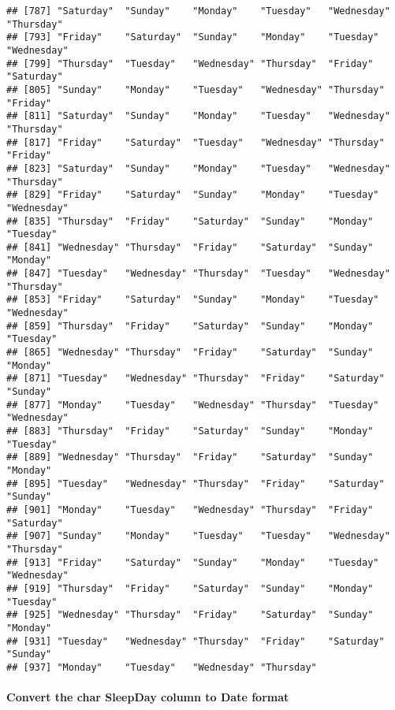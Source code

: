 \documentclass[
]{article}
\newenvironment{Shaded}{\begin{snugshade}}{\end{snugshade}}
\newcommand{\CommentTok}[1]{\textcolor[rgb]{0.56,0.35,0.01}{\textit{#1}}}
\newcommand{\FunctionTok}[1]{\textcolor[rgb]{0.00,0.00,0.00}{#1}}
\newcommand{\NormalTok}[1]{#1}
\newcommand{\OtherTok}[1]{\textcolor[rgb]{0.56,0.35,0.01}{#1}}
\newcommand{\SpecialCharTok}[1]{\textcolor[rgb]{0.00,0.00,0.00}{#1}}
\newcommand{\StringTok}[1]{\textcolor[rgb]{0.31,0.60,0.02}{#1}}
\begin{document}
\begin{verbatim}
## [787] "Saturday"  "Sunday"    "Monday"    "Tuesday"   "Wednesday" "Thursday" 
## [793] "Friday"    "Saturday"  "Sunday"    "Monday"    "Tuesday"   "Wednesday"
## [799] "Thursday"  "Tuesday"   "Wednesday" "Thursday"  "Friday"    "Saturday" 
## [805] "Sunday"    "Monday"    "Tuesday"   "Wednesday" "Thursday"  "Friday"   
## [811] "Saturday"  "Sunday"    "Monday"    "Tuesday"   "Wednesday" "Thursday" 
## [817] "Friday"    "Saturday"  "Tuesday"   "Wednesday" "Thursday"  "Friday"   
## [823] "Saturday"  "Sunday"    "Monday"    "Tuesday"   "Wednesday" "Thursday" 
## [829] "Friday"    "Saturday"  "Sunday"    "Monday"    "Tuesday"   "Wednesday"
## [835] "Thursday"  "Friday"    "Saturday"  "Sunday"    "Monday"    "Tuesday"  
## [841] "Wednesday" "Thursday"  "Friday"    "Saturday"  "Sunday"    "Monday"   
## [847] "Tuesday"   "Wednesday" "Thursday"  "Tuesday"   "Wednesday" "Thursday" 
## [853] "Friday"    "Saturday"  "Sunday"    "Monday"    "Tuesday"   "Wednesday"
## [859] "Thursday"  "Friday"    "Saturday"  "Sunday"    "Monday"    "Tuesday"  
## [865] "Wednesday" "Thursday"  "Friday"    "Saturday"  "Sunday"    "Monday"   
## [871] "Tuesday"   "Wednesday" "Thursday"  "Friday"    "Saturday"  "Sunday"   
## [877] "Monday"    "Tuesday"   "Wednesday" "Thursday"  "Tuesday"   "Wednesday"
## [883] "Thursday"  "Friday"    "Saturday"  "Sunday"    "Monday"    "Tuesday"  
## [889] "Wednesday" "Thursday"  "Friday"    "Saturday"  "Sunday"    "Monday"   
## [895] "Tuesday"   "Wednesday" "Thursday"  "Friday"    "Saturday"  "Sunday"   
## [901] "Monday"    "Tuesday"   "Wednesday" "Thursday"  "Friday"    "Saturday" 
## [907] "Sunday"    "Monday"    "Tuesday"   "Tuesday"   "Wednesday" "Thursday" 
## [913] "Friday"    "Saturday"  "Sunday"    "Monday"    "Tuesday"   "Wednesday"
## [919] "Thursday"  "Friday"    "Saturday"  "Sunday"    "Monday"    "Tuesday"  
## [925] "Wednesday" "Thursday"  "Friday"    "Saturday"  "Sunday"    "Monday"   
## [931] "Tuesday"   "Wednesday" "Thursday"  "Friday"    "Saturday"  "Sunday"   
## [937] "Monday"    "Tuesday"   "Wednesday" "Thursday"
\end{verbatim}

\hypertarget{convert-the-char-sleepday-column-to-date-format}{%
\paragraph{Convert the char SleepDay column to Date
format}\label{convert-the-char-sleepday-column-to-date-format}}

\begin{Shaded}
\end{Shaded}
\end{document}
